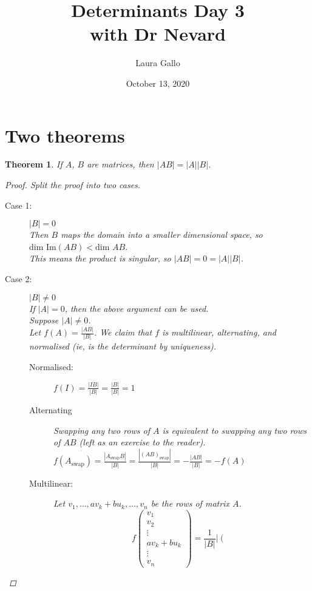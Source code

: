 \documentclass{article}
\title{Determinants Day 3 \\ with Dr Nevard}
\author{Laura Gallo}
\date{October 13, 2020}
\newtheorem{theorem}{Theorem}
\theoremstyle{definition}
\begin{document}
\maketitle

\section{Two theorems}
\begin{theorem}
	If $A$, $B$ are matrices, then $|AB|=|A||B|$.
	\begin{proof}
		Split the proof into two cases.
		\begin{description}
			\item[Case 1:] $|B|=0$ \\
				Then $B$ maps the domain into a smaller dimensional space, so $\text{dim Im}(AB)<\text{dim }AB$. \\
				This means the product is singular, so $|AB|=0=|A||B|$.
			\item[Case 2:] $|B|\neq 0$ \\
				If $|A|=0$, then the above argument can be used. \\
				Suppose $|A|\neq 0$. \\
				Let $f(A)=\frac{|AB|}{|B|}$. We claim that $f$ is multilinear, alternating, and normalised (ie, is the determinant by uniqueness).
				\begin{description}
					\item[Normalised:] $f(I)=\frac{|IB|}{|B|}=\frac{|B|}{|B|}=1$
					\item[Alternating] Swapping any two rows of $A$ is equivalent to swapping any two rows of $AB$ (left as an exercise to the reader). \\
						$f(A_\text{swap})=\frac{|A_\text{swap}B|}{|B|}=\frac{|(AB)_\text{swap}|}{|B|}=-\frac{|AB|}{|B|}=-f(A)$
					\item[Multilinear:] Let $v_1,\dots,av_k+bu_k,\dots,v_n$ be the rows of matrix $A$.
						\begin{equation*}
							f\left(
								\begin{matrix}
									v_1 \\
									v_2 \\
									\vdots \\
									av_k+bu_k \\
									\vdots \\
									v_n
								\end{matrix}
							\right) = \frac{1}{|B|}\left|
								\left(
									\begin{matrix}

\end{matrix}
\end{equation*}
\end{description}
\end{description}
\end{proof}
\end{theorem}
\end{document}
